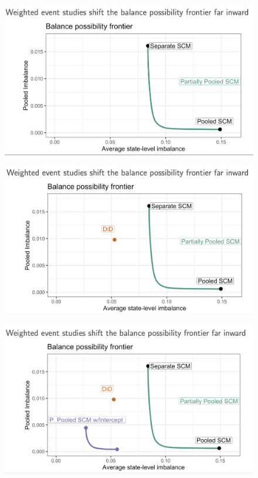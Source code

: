 \documentclass{beamer}
\begin{document}
\begin{frame}[plain]

	\begin{figure}
	\includegraphics[scale=0.4]{./lecture_includes/augsynth_26.png}
	\end{figure}

\end{frame}
\begin{frame}[plain]

	\begin{figure}
	\includegraphics[scale=0.4]{./lecture_includes/augsynth_27.png}
	\end{figure}

\end{frame}
\begin{frame}[plain]

	\begin{figure}
	\includegraphics[scale=0.4]{./lecture_includes/augsynth_28.png}
	\end{figure}

\end{frame}
\end{document}
